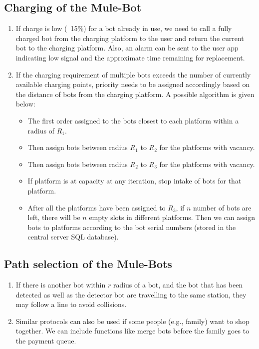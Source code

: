 \documentclass{article}
\begin{document}
\subsection{Charging of the Mule-Bot}
\begin{enumerate}
    \item If charge is low (~15\%) for a bot already in use, we need to call a fully charged bot from the charging platform to the user and return the current bot to the charging platform. Also, an alarm can be sent to the user app indicating low signal and the approximate time remaining for replacement.
    \item If the charging requirement of multiple bots exceeds the number of currently available charging points, priority needs to be assigned accordingly based on the distance of bots from the charging platform. A possible algorithm is given below:
    \begin{itemize}
        \item The first order assigned to the bots closest to each platform within a radius of $R_1$.
        \item Then assign bots between radius $R_1$ to $R_2$ for the platforms with vacancy.
        \item Then assign bots between radius $R_2$ to $R_3$ for the platforms with vacancy.
        \item If platform is at capacity at any iteration, stop intake of bots for that platform.
        \item After all the platforms have been assigned to $R_3$, if $n$ number of bots are left, there will be $n$ empty slots in different platforms. Then we can assign bots to platforms according to the bot serial numbers (stored in the central server SQL database).
    \end{itemize}
\end{enumerate}
\subsection{Path selection of the Mule-Bots}
\begin{enumerate}
    \item If there is another bot within $r$ radius of a bot, and the bot that has been detected as well as the detector bot are travelling to the same station, they may follow a line to avoid collisions.
    \item Similar protocols can also be used if some people (e.g., family) want to shop together. We can include functions like merge bots before the family goes to the payment queue.
\end{enumerate}
\end{document}
